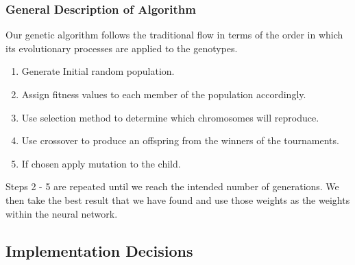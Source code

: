 \documentclass[12pt]{article}
\begin{document}
\subsubsection{General Description of Algorithm}

Our genetic algorithm follows the traditional flow in terms of the order in which its evolutionary processes are applied to the genotypes.

\begin{enumerate}

\item Generate Initial random population.
\item Assign fitness values to each member of the population accordingly.
\item Use selection method to determine which chromosomes will reproduce.
\item Use crossover to produce an offspring from the winners of the tournaments.
\item If chosen apply mutation to the child.
\end{enumerate}

Steps 2 - 5 are repeated until we reach the intended number of generations. We then take the best result that we have found and use those weights as the weights within the neural network.


\subsection{Implementation Decisions}
\end{document}
